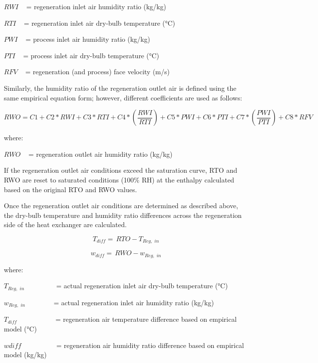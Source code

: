 \(RWI\) ~ = regeneration inlet air humidity ratio (kg/kg)

\(RTI\) ~ = regeneration inlet air dry-bulb temperature (°C)

\(PWI\) ~ = process inlet air humidity ratio (kg/kg)

\(PTI\) ~ = process inlet air dry-bulb temperature (°C)

\(RFV\) ~ = regeneration (and process) face velocity (m/s)

Similarly, the humidity ratio of the regeneration outlet air is defined using the same empirical equation form; however, different coefficients are used as follows:

\begin{equation}
RWO = C1 + C2*RWI + C3*RTI + C4*\left( {\frac{{RWI}}{{RTI}}} \right) + C5*PWI + C6*PTI + C7*\left( {\frac{{PWI}}{{PTI}}} \right) + C8*RFV
\end{equation}

where:

\(RWO\) ~ = regeneration outlet air humidity ratio (kg/kg)

If the regeneration outlet air conditions exceed the saturation curve, RTO and RWO are reset to saturated conditions (100\% RH) at the enthalpy calculated based on the original RTO and RWO values.

Once the regeneration outlet air conditions are determined as described above, the dry-bulb temperature and humidity ratio differences across the regeneration side of the heat exchanger are calculated.

\begin{equation}
{T_{diff}} = \,RTO - {T_{Reg,\,\,in}}
\end{equation}

\begin{equation}
{w_{diff}} = \,RWO - {w_{Reg,\,\,in}}
\end{equation}

where:

\({T_{Reg,\,\,in}}\) ~~~~~~~~ = actual regeneration inlet air dry-bulb temperature (°C)

\({w_{Reg,\,\,in}}\) ~~~~~~~ = actual regeneration inlet air humidity ratio (kg/kg)

\({T_{diff}}\) ~~~~~~~~~~ = regeneration air temperature difference based on empirical model (°C)

\(wdiff\) ~~~~~~~~~ = regeneration air humidity ratio difference based on empirical model (kg/kg)

